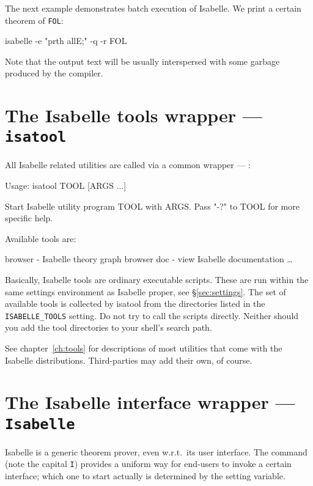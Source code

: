 \medskip The next example demonstrates batch execution of Isabelle. We
print a certain theorem of \texttt{FOL}:
\begin{ttbox}
isabelle -e "prth allE;" -q -r FOL
\end{ttbox}
Note that the output text will be usually interspersed with some
garbage produced by the {\ML} compiler.


\section{The Isabelle tools wrapper --- \texttt{isatool}} \label{sec:isatool}

All Isabelle related utilities are called via a common wrapper ---
:
\begin{ttbox}
Usage: isatool TOOL [ARGS ...]

  Start Isabelle utility program TOOL with ARGS. Pass "-?" to TOOL
  for more specific help.

  Available tools are:

    browser - Isabelle theory graph browser
    doc - view Isabelle documentation
    \dots
\end{ttbox}
Basically, Isabelle tools are ordinary executable scripts.  These are
run within the same settings environment as Isabelle proper, see
\S\ref{sec:settings}.  The set of available tools is collected by
isatool from the directories listed in the \texttt{ISABELLE_TOOLS}
setting.  Do not try to call the scripts directly. Neither should you
add the tool directories to your shell's search path.


\medskip See chapter~\ref{ch:tools} for descriptions of most utilities
that come with the Isabelle distributions. Third-parties may add their
own, of course.


\section{The Isabelle interface wrapper --- \texttt{Isabelle}} \label{sec:interface}

Isabelle is a generic theorem prover, even w.r.t.\ its user interface.  The
 command (note the capital \texttt{I}) provides a uniform
way for end-users to invoke a certain interface; which one to start actually
is determined by the  setting variable.

